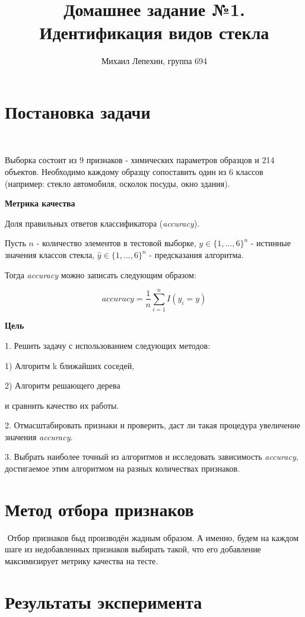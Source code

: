 \documentclass[12pt]{article}
\author{Михаил Лепехин, группа 694}
\title{Домашнее задание №1. Идентификация видов стекла}
\begin{document}
  \maketitle
  
\section*{Постановка задачи}
  $ $
  
Выборка состоит из 9 признаков - химических параметров образцов и 214 объектов. Необходимо каждому образцу сопоставить один из 6 классов (например: стекло автомобиля, осколок посуды, окно здания).

\textbf{Метрика качества}

 Доля правильных ответов классификатора (\textit{accuracy}). 

 Пусть $n$ - количество элементов в тестовой выборке, $y \in \{1, ..., 6\}^n$ - истинные значения классов стекла,  $\widehat{y} \in \{1, ..., 6\}^n$ - предсказания алгоритма.
 
 Тогда \textit{accuracy} можно записать следующим образом:
 
 $$accuracy = \frac{1}{n}\sum\limits_{i=1}^n I(y_i=y) $$

\textbf{Цель}

1.$ $ Решить задачу с использованием следующих методов:

1) Алгоритм k ближайших соседей,

2) Алгоритм решающего дерева

и сравнить качество их работы. 

2.$ $ Отмасштабировать признаки и проверить, даст ли такая процедура увеличение значения \textit{accuracy}.

3.$ $ Выбрать наиболее точный из алгоритмов и исследовать зависимость \textit{accuracy}, достигаемое этим алгоритмом на разных количествах признаков.  
  
\section*{Метод отбора признаков}  
$ $
Отбор признаков быд производён жадным образом. А именно, будем на каждом шаге из недобавленных признаков выбирать такой, что его добавление максимизирует метрику качества на тесте.
  
\section*{Результаты эксперимента}  
  
\end{document}
